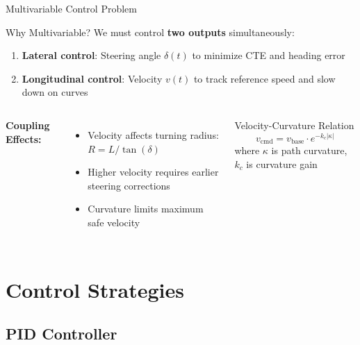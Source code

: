 \documentclass[10pt]{beamer}
\begin{document}
\begin{frame}{Multivariable Control Problem}
  \begin{block}{Why Multivariable?}
    We must control \textbf{two outputs} simultaneously:
    \begin{enumerate}
      \item \textbf{Lateral control}: Steering angle $\delta(t)$ to minimize CTE and heading error
      \item \textbf{Longitudinal control}: Velocity $v(t)$ to track reference speed and slow down on curves
    \end{enumerate}
  \end{block}

  \vspace{0.3cm}

  \begin{columns}[c]
    \textbf{Coupling Effects:}
    \begin{itemize}
      \item Velocity affects turning radius: $R = L/\tan(\delta)$
      \item Higher velocity requires earlier steering corrections
      \item Curvature limits maximum safe velocity
    \end{itemize}

    \begin{block}{Velocity-Curvature Relation}
      $$v_{\text{cmd}} = v_{\text{base}} \cdot e^{-k_c |\kappa|}$$
      where $\kappa$ is path curvature, $k_c$ is curvature gain
    \end{block}
  \end{columns}
\end{frame}

\section{Control Strategies}

\subsection{PID Controller}
\end{document}
